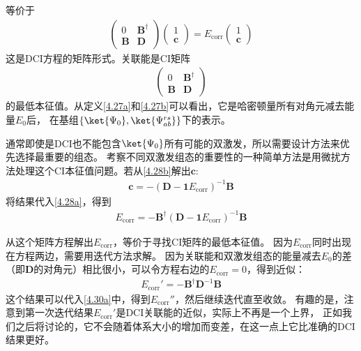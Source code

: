 等价于
\begin{align}
	\begin{pmatrix}
		0&\mathbf{B}^\dagger\\
		\mathbf{B}&\mathbf{D}
	\end{pmatrix}
	\begin{pmatrix}
		1\\
		\mathbf{c}
	\end{pmatrix}
	=E_{\text{corr}}
	\begin{pmatrix}
		1\\
		\mathbf{c}
	\end{pmatrix}
\end{align}
这是DCI方程的矩阵形式。关联能是CI矩阵
\begin{align}
	\begin{pmatrix}
		0&\mathbf{B}^\dagger\\
		\mathbf{B}&\mathbf{D}
	\end{pmatrix}
\end{align}
的最低本征值。从定义\autoref{4.27a}和\autoref{4.27b}可以看出，它是哈密顿量所有对角元减去\hft 能量$E_0$后，
在基组$\{\ket{\Psi_0}, \ket{\Psi_{ab}^{rs}}\}$下的表示。

通常即使是DCI也不能包含$\ket{\Psi_0}$所有可能的双激发，所以需要设计方法来优先选择最重要的组态。
考察不同双激发组态的重要性的一种简单方法是用微扰方法处理这个CI本征值问题。若从\autoref{4.28b}解出$\mathbf{c}$:
\begin{align}
	\mathbf{c}=-(\mathbf{D}-\mathbf{1}E_{\text{corr}})^{-1}\mathbf{B}
\end{align}
将结果代入\autoref{4.28a}，得到
\begin{align}
	E_{\text{corr}}=-\mathbf{B}^\dagger(\mathbf{D}-\mathbf{1}E_{\text{corr}})^{-1}\mathbf{B}\tag{4.30a}\label{4.30a}
\end{align}
\addtocounter{equation}{1}
从这个矩阵方程解出$E_{\text{corr}}$，等价于寻找CI矩阵的最低本征值。
因为$E_{\text{corr}}$同时出现在方程两边，需要用迭代方法求解。
因为关联能和双激发组态的能量减去$E_0$的差（即$\mathbf{D}$的对角元）相比很小，可以令方程右边的$E_{\text{corr}}=0$，得到近似：
\begin{align}
	E_{\text{corr}}'=-\mathbf{B}^\dagger\mathbf{D}^{-1}\mathbf{B}\tag{4.30b}\label{4.30b}
\end{align}
这个结果可以代入\autoref{4.30a}中，得到$E_{\text{corr}}''$，然后继续迭代直至收敛。
有趣的是，注意到第一次迭代结果$E_{\text{corr}}'$是DCI关联能的近似，实际上不再是一个上界，
正如我们之后将讨论的，它不会随着体系大小的增加而变差，在这一点上它比准确的DCI结果更好。

